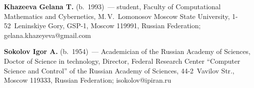   \vspace*{1pt}
 
\noindent
\textbf{Khazeeva Gelana T.} (b.\ 1993)~---
 student,  Faculty of Computational Mathematics and Cybernetics, M.\,V.~Lo\-monosov 
 Moscow State University, 1-52~Leninskiye Gory, GSP-1, Moscow 119991, 
 Russian Federation; \mbox{gelana.khazeyeva@gmail.com} 

 
 \vspace*{1pt}
 
\noindent
\textbf{Sokolov Igor A.} (b.\ 1954)~---
Academician of the Russian Academy of Sciences, Doctor of Science in technology, 
Director, Federal Research Center ``Computer Science and Control'' of 
the Russian Academy of Sciences, 44-2~Vavilov Str., Moscow 119333, Russian Federation; 
\mbox{isokolov@ipiran.ru}
\label{end\stat}


\renewcommand{\bibname}{\protect\rm Литература} 